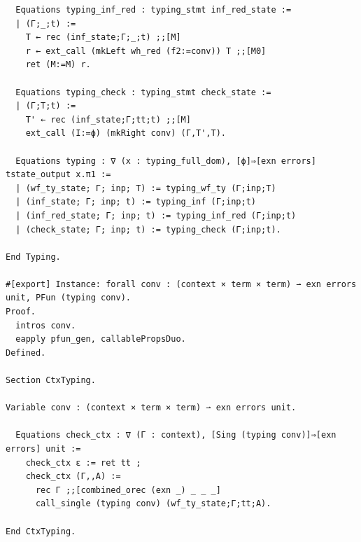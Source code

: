 \begin{lstlisting}
  Equations typing_inf_red : typing_stmt inf_red_state :=
  | (Γ;_;t) :=
    T ← rec (inf_state;Γ;_;t) ;;[M]
    r ← ext_call (mkLeft wh_red (f2:=conv)) T ;;[M0]
    ret (M:=M) r.

  Equations typing_check : typing_stmt check_state :=
  | (Γ;T;t) :=
    T' ← rec (inf_state;Γ;tt;t) ;;[M]
    ext_call (I:=ϕ) (mkRight conv) (Γ,T',T).

  Equations typing : ∇ (x : typing_full_dom), [ϕ]⇒[exn errors] tstate_output x.π1 :=
  | (wf_ty_state; Γ; inp; T) := typing_wf_ty (Γ;inp;T)
  | (inf_state; Γ; inp; t) := typing_inf (Γ;inp;t)
  | (inf_red_state; Γ; inp; t) := typing_inf_red (Γ;inp;t)
  | (check_state; Γ; inp; t) := typing_check (Γ;inp;t).

End Typing.

#[export] Instance: forall conv : (context × term × term) ⇀ exn errors unit, PFun (typing conv).
Proof.
  intros conv.
  eapply pfun_gen, callablePropsDuo.
Defined.

Section CtxTyping.

Variable conv : (context × term × term) ⇀ exn errors unit.

  Equations check_ctx : ∇ (Γ : context), [Sing (typing conv)]⇒[exn errors] unit :=
    check_ctx ε := ret tt ;
    check_ctx (Γ,,A) :=
      rec Γ ;;[combined_orec (exn _) _ _ _]
      call_single (typing conv) (wf_ty_state;Γ;tt;A).

End CtxTyping.
\end{lstlisting}

